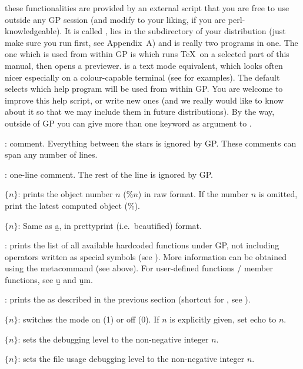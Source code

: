  these functionalities are provided by an
external  script that you are free to use outside any GP session
(and modify to your liking, if you are perl-knowledgeable). It is called
, lies in the  subdirectory of your distribution
(just make sure you run  first, see Appendix~A) and is
really two programs in one. The one which is used from within GP is
 which runs \TeX\ on a selected part of this manual, then opens
a previewer.  is a text mode equivalent, which looks
often nicer especially on a colour-capable terminal (see
 for examples). The default  selects which
help program will be used from within GP. You are welcome to improve this
help script, or write new ones (and we really would like to know about it
so that we may include them in future distributions). By the way, outside
of GP you can give more than one keyword as argument to .

: comment. Everything between the stars is ignored by
GP. These comments can span any number of lines.

\subseckbd{\bs\bs}: one-line comment. The rest of the line
is ignored by GP.

 $\{n\}$: prints the object number $n$ ($\%n$)
in raw format. If the number $n$ is omitted, print the latest computed object
($\%$). \label{se:history}

 $\{n\}$: Same as \b{a}, in prettyprint (i.e.~beautified)
format.

: prints the list of all available
hardcoded functions under GP, not including operators written as special
symbols (see ). More information can be obtained using
the  metacommand (see above). For user-defined functions / member
functions, see \b{u} and \b{um}.

: prints the  as described in the
previous section (shortcut for , see ).

 $\{n\}$: switches the  mode on (1) or off (0). If
$n$ is explicitly given, set echo to $n$.

 $\{n\}$: sets the debugging level  to the
non-negative integer $n$.

 $\{n\}$: sets the file usage debugging level 
to the non-negative integer $n$.

